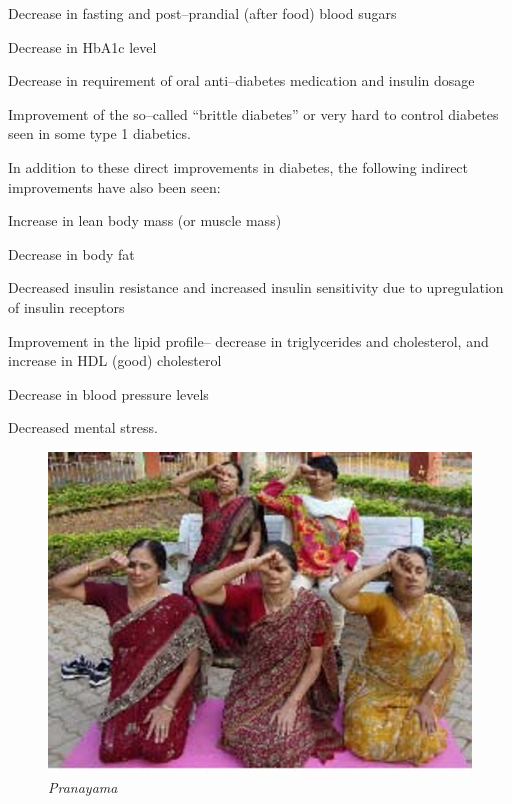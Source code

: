 \item Decrease in fasting and post–prandial (after food) blood sugars

 \item Decrease in HbA1c level

 \item Decrease in requirement of oral anti–diabetes medication and insulin dosage

 \item Improvement of the so–called “brittle diabetes” or very hard to control diabetes seen in some type 1 diabetics.

In addition to these direct improvements in diabetes, the following indirect improvements have also been seen:

\item Increase in lean body mass (or muscle mass)

 \item Decrease in body fat

 \item Decreased insulin resistance and increased insulin sensitivity due to upregulation of insulin receptors

 \item Improvement in the lipid profile– decrease in triglycerides and cholesterol, and increase in HDL (good) cholesterol

 \item Decrease in blood pressure levels

 \item Decreased mental stress.


\begin{figure}
\includegraphics{images/091.jpg}
\caption{\textit{Pranayama}}
\end{figure}

